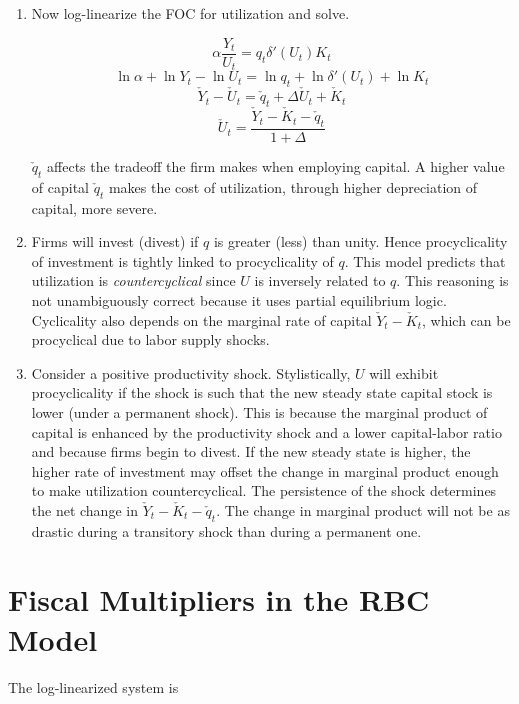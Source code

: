 \documentclass[11pt]{article}
\begin{document}
\begin{enumerate}
        \item Now log-linearize the FOC for utilization and solve.

            $$ \alpha \frac{Y_t}{U_t} = q_t \delta'(U_t) K_t $$
            $$ \ln \alpha + \ln Y_t - \ln U_t = \ln q_t + \ln \delta'(U_t) + \ln K_t $$
            $$ \check Y_t - \check U_t = \check q_t + \Delta \check U_t + \check K_t $$
            $$ \check U_t = \frac{\check Y_t - \check K_t - \check q_t}{1 + \Delta} $$

        $\check q_t$ affects the tradeoff the firm makes when employing capital. A higher value of capital $\check q_t$ makes the cost of utilization, through higher depreciation of capital, more severe.

        \item Firms will invest (divest) if $q$ is greater (less) than unity. Hence procyclicality of investment is tightly linked to procyclicality of $q$. This model predicts that utilization is \emph{countercyclical} since $U$ is inversely related to $q$. This reasoning is not unambiguously correct because it uses partial equilibrium logic. Cyclicality also depends on the marginal rate of capital $\check Y_t - \check K_t$, which can be procyclical due to labor supply shocks.

        \item Consider a positive productivity shock. Stylistically, $U$ will exhibit procyclicality if the shock is such that the new steady state capital stock is lower (under a permanent shock). This is because the marginal product of capital is enhanced by the productivity shock and a lower capital-labor ratio and because firms begin to divest. If the new steady state is higher, the higher rate of investment may offset the change in marginal product enough to make utilization countercyclical. The persistence of the shock determines the net change in $\check Y_t - \check K_t - \check q_t$. The change in marginal product will not be as drastic during a transitory shock than during a permanent one.

    \end{enumerate}

\section{Fiscal Multipliers in the RBC Model}

    The log-linearized system is
\end{document}
